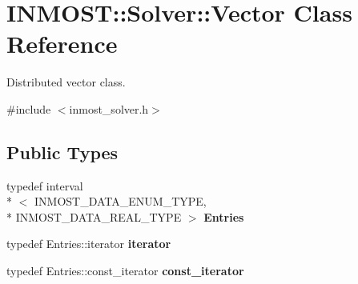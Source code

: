 \hypertarget{classINMOST_1_1Solver_1_1Vector}{\section{I\-N\-M\-O\-S\-T\-:\-:Solver\-:\-:Vector Class Reference}
\label{classINMOST_1_1Solver_1_1Vector}
}


Distributed vector class.  




{\ttfamily \#include $<$inmost\-\_\-solver.\-h$>$}

\subsection*{Public Types}
\begin{DoxyCompactItemize}
\item 
\hypertarget{classINMOST_1_1Solver_1_1Vector_aa6542e5c0e63c5df96177efa8e57baf6}{typedef interval\\*
$<$ I\-N\-M\-O\-S\-T\-\_\-\-D\-A\-T\-A\-\_\-\-E\-N\-U\-M\-\_\-\-T\-Y\-P\-E, \\*
I\-N\-M\-O\-S\-T\-\_\-\-D\-A\-T\-A\-\_\-\-R\-E\-A\-L\-\_\-\-T\-Y\-P\-E $>$ {\bfseries Entries}}\label{classINMOST_1_1Solver_1_1Vector_aa6542e5c0e63c5df96177efa8e57baf6}

\item 
\hypertarget{classINMOST_1_1Solver_1_1Vector_aac42d705099eaecd6ac7435d09f51f3d}{typedef Entries\-::iterator {\bfseries iterator}}\label{classINMOST_1_1Solver_1_1Vector_aac42d705099eaecd6ac7435d09f51f3d}

\item 
\hypertarget{classINMOST_1_1Solver_1_1Vector_a6ddbd17be9dcfc1785b623aa40ff7391}{typedef Entries\-::const\-\_\-iterator {\bfseries const\-\_\-iterator}}\label{classINMOST_1_1Solver_1_1Vector_a6ddbd17be9dcfc1785b623aa40ff7391}

\end{DoxyCompactItemize}
